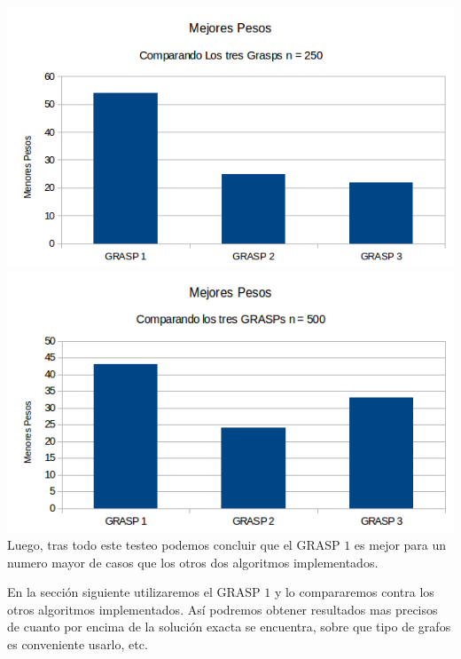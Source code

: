 \includegraphics[scale=0.7]{Ej5/CompetenciaGRASPs2.png}\\

\includegraphics[scale=0.7]{Ej5/CompetenciaGRASPs3.png}\\

Luego, tras todo este testeo podemos concluir que el GRASP $1$ es mejor para un numero mayor de casos que los otros dos algoritmos implementados.

En la sección siguiente utilizaremos el GRASP $1$ y lo compararemos contra los otros algoritmos implementados. Así podremos obtener resultados mas precisos de cuanto por encima de la solución exacta se encuentra, sobre que tipo de grafos es conveniente usarlo, etc.
